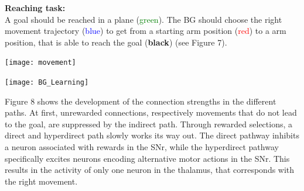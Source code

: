 \documentclass[portrait,final,a0paper,fontscale=0.33]{baposter}
\begin{document}
\begin{poster}
{	\begin{adjustbox}{minipage=0.95\textwidth, margin=5pt, center}
		
		\begin{minipage}[l]{0.35\textwidth}
			\textbf{Reaching task:} \\
			
			A goal should be reached in a plane (\textcolor{green}{green}). The BG should choose the right movement trajectory (\textcolor{blue}{blue}) to get from a starting arm position (\textcolor{red}{red}) to a arm position, that is able to reach the goal (\textbf{black}) (see Figure 7).
			
			\vspace{3pt}
			
			\texttt{[image: movement]}
			
			\vfill
		\end{minipage}
		\hfill
		\begin{minipage}[r]{0.65\textwidth}
			\vspace{30pt}
			\hspace{6pt}
			\texttt{[image: BG\_Learning]}
		\end{minipage}
		
		\vspace{1pt}
			
		\begin{minipage}[b]{\textwidth}
			\begin{multicols}{2}
			Figure 8 shows the development of the connection strengths in the different paths.
			At first, unrewarded connections, respectively movements that do not lead to the goal, are suppressed by the indirect path. Through rewarded selections, a direct and hyperdirect path slowly works its way out.
			The direct pathway inhibits a neuron associated with rewards in the SNr, while the hyperdirect pathway specifically excites neurons encoding alternative motor actions in the SNr. This results in the activity of only one neuron in the thalamus, that corresponds with the right movement.
			\end{multicols}
		\end{minipage}
	
	\end{adjustbox}

	

}


\end{poster}
\end{document}
